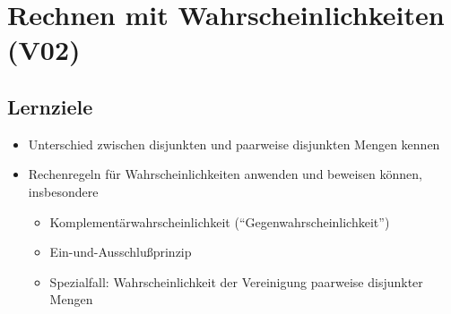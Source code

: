 \chapter{Rechnen mit Wahrscheinlichkeiten (V02)}
\label{ch:rechnen-mit-wahrscheinlichkeiten}

\section*{Lernziele}
\begin{itemize}
    \item Unterschied zwischen disjunkten und paarweise disjunkten Mengen kennen
    \item Rechenregeln für Wahrscheinlichkeiten anwenden und beweisen können, insbesondere
    \begin{itemize}
        \item Komplementärwahrscheinlichkeit (``Gegenwahrscheinlichkeit'')
        \item Ein-und-Ausschlußprinzip
        \item Spezialfall: Wahrscheinlichkeit der Vereinigung paarweise disjunkter Mengen
    \end{itemize}
\end{itemize}

